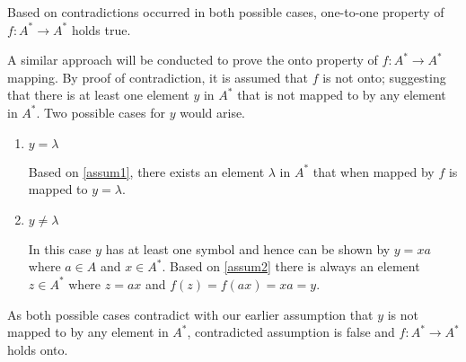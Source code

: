 Based on contradictions occurred in both possible cases, one-to-one property of $f:A^*\rightarrow A^*$ holds true.

A similar approach will be conducted to prove the onto property of $f:A^*\rightarrow A^*$ mapping.
By proof of contradiction, it is assumed that $f$ is not onto; suggesting that there is at least one element $y$ in $A^*$ that is not mapped to by any element in $A^*$.
Two possible cases for $y$ would arise.

\begin{enumerate}[label=(\alph*)]
\item $y = \lambda$

Based on \eqref{assum1}, there exists an element $\lambda$ in $A^*$ that when mapped by $f$ is mapped to $y = \lambda$.
\item $y \neq \lambda$

In this case $y$ has at least one symbol and hence can be shown by $y=xa$ where $a \in A$ and $x \in A^*$.
Based on \eqref{assum2} there is always an element $z \in A^*$ where $z = ax$ and $f(z) = f(ax) = xa = y$.

\end{enumerate}

As both possible cases contradict with our earlier assumption that $y$ is not mapped to by any element in $A^*$, contradicted assumption is false and $f:A^*\rightarrow A^*$ holds onto.
